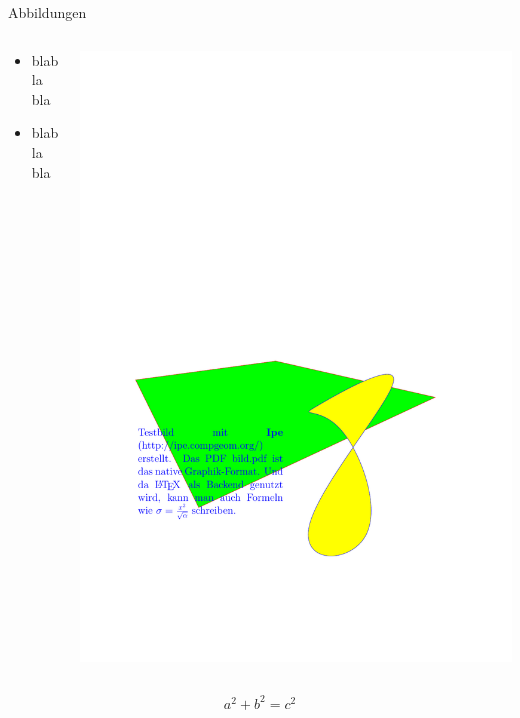 \begin{frame}{Abbildungen}
	\begin{columns}
		\begin{column}{0.5\linewidth}
			\begin{itemize}
				\item blabla bla 
				\item blabla bla 	
			\end{itemize}
		\end{column}
		\begin{column}{0.5\linewidth}
			\includegraphics[width=1\linewidth]{images/bild}
		\end{column}		
	\end{columns}

	\begin{equation}
		a^2 + b^2 = c^2
	\end{equation}
\end{frame}



